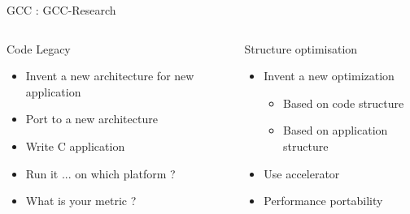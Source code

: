 \begin{Frame}{GCC : GCC-Research}
 \begin{columns}[t]
  \begin{column}{\BW}
    \begin{block}{Code Legacy}
      \begin{itemize}
        \item Invent a new architecture for new application
        \item Port to a new architecture
        \item Write C application
        \item Run it ... on which platform ?
        \item What is your metric ?
      \end{itemize}
    \end{block}
  \end{column}
  \begin{column}{\BW}
    \begin{block}{Structure optimisation}
      \begin{itemize}
      \item Invent a new optimization
        \begin{itemize}
        \item Based on code structure
        \item Based on application structure
        \end{itemize}
      \item Use accelerator
      \item Performance portability
      \end{itemize}
    \end{block}

  \end{column}
 \end{columns}
\end{Frame}
